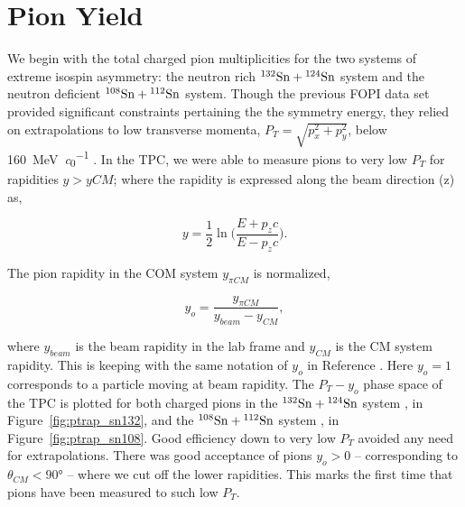 

\section{Pion Yield}

We begin with the total charged pion multiplicities for the two systems of extreme isospin asymmetry:  the neutron rich ${}^{132}\mathrm{Sn} + {}^{124}\mathrm{Sn}$ system and the neutron deficient  ${}^{108}\mathrm{Sn} + {}^{112}\mathrm{Sn}$ system. Though the previous FOPI data set provided significant constraints pertaining the the symmetry energy, they relied on extrapolations to low transverse momenta, $P_T = \sqrt{p_x^2 + p_y^2}$, below \SI{160}{\mega\electronvolt\per\clight} \cite{fopi}. In the \spirit TPC, we were able to measure pions to very low $P_T$ for rapidities $y > y{CM}$; where the rapidity is expressed along the beam direction (z) as,

\begin{equation}
y = \frac{1}{2} \ln\Big( \frac{E + p_zc}{E - p_zc}\Big).
\end{equation}

The pion rapidity in the COM system $y_{\pi CM}$ is normalized,

\begin{equation}
y_o = \frac{y_{\pi CM}}{y_{beam} - y_{CM}},
\end{equation}

where $y_{beam}$ is the beam rapidity in the lab frame and $y_{CM}$ is the CM system rapidity. This is keeping with the same notation of $y_o$ in Reference \cite{fopi}. Here $y_o = 1$ corresponds to a particle moving at beam rapidity. The   $P_T - y_o$ phase space of the \spirit TPC is plotted for both charged pions in the ${}^{132}\mathrm{Sn} + {}^{124}\mathrm{Sn}$ system , in Figure~\ref{fig:ptrap_sn132}, and the ${}^{108}\mathrm{Sn} + {}^{112}\mathrm{Sn}$ system , in Figure~\ref{fig:ptrap_sn108}. Good efficiency down to very low $P_T$ avoided any need for extrapolations. There was good acceptance of pions $y_o > 0$ -- corresponding to $\theta_{CM} < \ang{90}$ -- where we cut off the lower rapidities. This marks the first time that pions have been measured to such low $P_T$. 

